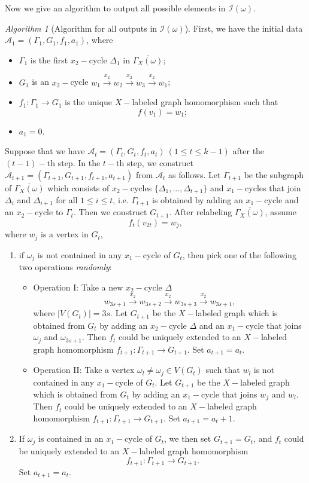 \documentclass{amsart}
\theoremstyle{plain}
\theoremstyle{definition}
\theoremstyle{remark}
\newtheorem*{Algo*}{Algorithm}
\begin{document}
Now we give an algorithm to output all possible elements in $\mathcal{I}(\omega)$.
\begin{Algo*}[Algorithm for all outputs in $\mathcal{I}(\omega)$]
First, we have the initial data $\mathcal{A}_1=(\Gamma_1,G_1,f_1,a_1)$, where 
\begin{itemize}
    \item $\Gamma_1$ is the first $x_2-$cycle $\Delta_1$ in $\overline{\Gamma_X(\omega)}$;
    \item $G_1$ is an $x_2-$cycle $w_1\overset{x_2}{\to}w_2\overset{x_2}{\to}w_3\overset{x_2}{\to}w_1$;
    \item $f_1:\Gamma_1\to G_1$ is the unique $X-$labeled graph homomorphism such that $$f(v_1)=w_1;$$
    \item $a_1=0$.
\end{itemize}
Suppose that we have $\mathcal{A}_t=(\Gamma_t,G_t,f_t,a_t)\ (1\leq t\leq k-1)$ after the $(t-1)-$th step. In the $t-$th step, we construct $\mathcal{A}_{t+1}=(\Gamma_{t+1},G_{t+1},f_{t+1},a_{t+1})$ from $\mathcal{A}_t$ as follows. Let $\Gamma_{t+1}$ be the subgraph of $\overline{\Gamma_X(\omega)}$ which consists of $x_2-$cycles $\{\Delta_1,...,\Delta_{t+1}\}$ and $x_1-$cycles that join $\Delta_i$ and $\Delta_{i+1}$ for all $1\leq i\leq t$, i.e. $\Gamma_{t+1}$ is obtained by adding an $x_1-$cycle and an $x_2-$cycle to $\Gamma_t$. Then we construct $G_{t+1}$. After relabeling $\overline{\Gamma_X(\omega)}$, 
assume $$f_t(v_{2t})=w_j,$$ where $w_j$ is a vertex in $G_t$,
\begin{enumerate}
    \item if $\omega_j$ is not contained in any $x_1-$cycle of $G_t$, then
    pick one of the following two operations \emph{randomly}:
    \begin{itemize}
   \item Operation I: Take a new $x_2-$cycle $\Delta$
   $$w_{3s+1}\overset{x_2}{\to}w_{3s+2}\overset{x_2}{\to}w_{3s+3}\overset{x_2}{\to}w_{3s+1},$$
   where $|V(G_t)|=3s$. Let $G_{t+1}$ be the $X-$labeled graph which is obtained from $G_t$ by adding an $x_2-$cycle $\Delta$ and an $x_1-$cycle that joins $\omega_j$ and $\omega_{3s+1}$. Then $f_t$ could be uniquely extended to an $X-$labeled graph homomorphism $f_{t+1}:\Gamma_{t+1}\to G_{t+1}$. Set $a_{t+1}=a_t$.

   \item Operation II: Take a vertex $\omega_l\neq \omega_j\in V(G_t)$ such that $w_l$ is not contained in any $x_1-$cycle of $G_t$. Let $G_{t+1}$ be the $X-$labeled graph which is obtained from $G_t$ by adding an $x_1-$cycle that joins $w_j$ and $w_l$. Then $f_t$ could be uniquely extended to an $X-$labeled graph homomorphism $f_{t+1}:\Gamma_{t+1}\to G_{t+1}$. Set $a_{t+1}=a_t+1$.
   \end{itemize}
    \item  If $\omega_j$ is contained in an $x_1-$cycle of $G_t$, we then set $G_{t+1}=G_t$, and $f_t$ could be uniquely extended to an $X-$labeled graph homomorphism $$f_{t+1}:\Gamma_{t+1}\to G_{t+1}.$$ Set $a_{t+1}=a_t$.
\end{enumerate}


\end{Algo*}
\end{document}
